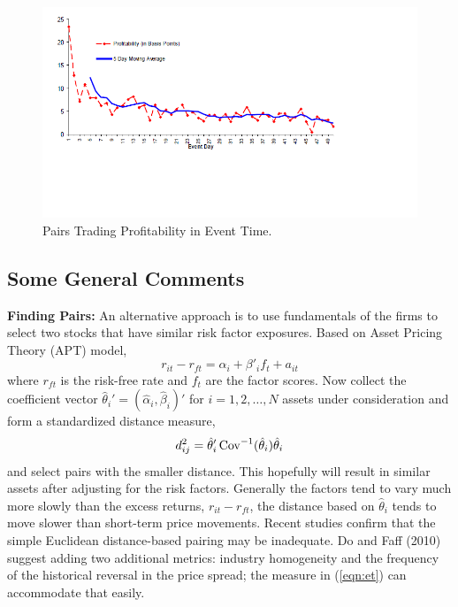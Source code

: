 	\begin{figure}[!ht]
	\centering
	\includegraphics[width=\textwidth]{chapters/chapter_stat_ts/figures/Sec4-7Fig4.png}
	\caption{Pairs Trading Profitability in Event Time. \label{fig:pairsprofit}}
	\end{figure}


\subsection{Some General Comments}


\noindent\textbf{Finding Pairs:} An alternative approach is to use fundamentals of the firms to select two stocks that have similar risk factor exposures. Based on Asset Pricing Theory (APT) model,
	\begin{equation}
	r_{it} - r_{ft} = \alpha_i + \beta'_if_t + a_{it}
	\end{equation}
where $r_{ft}$ is the risk-free rate and $f_t$ are the factor scores. Now collect the coefficient vector $\hat{\theta}_i' = (\hat{\alpha}_i, \hat{\beta}_i)'$ for $i = 1,2,\ldots,N$ assets under consideration and form a standardized distance measure,
	\begin{equation}
	d_{ij}^2 = \hat{\theta}_i' \operatorname{Cov}^{-1}(\hat{\theta}_i)\hat{\theta}_i
	\end{equation}
and select pairs with the smaller distance. This hopefully will result in similar assets after adjusting for the risk factors. Generally the factors tend to vary much more slowly than the excess returns, $r_{it} - r_{ft}$, the distance based on $\hat{\theta}_i$ tends to move slower than short-term price movements. Recent studies confirm that the simple Euclidean distance-based pairing may be inadequate. Do and Faff (2010)~\cite{do2010does} suggest adding two additional metrics: industry homogeneity and the frequency of the historical reversal in the price spread; the measure in (\ref{eqn:et}) can accommodate that easily. \\

